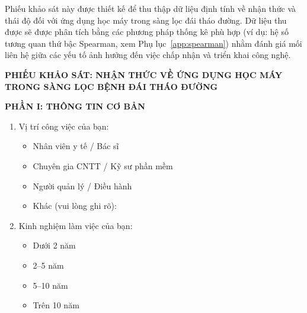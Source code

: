 \documentclass[14pt,a4paper]{extreport}
\begin{document}
Phiếu khảo sát này được thiết kế để thu thập dữ liệu định tính về nhận thức và thái độ đối với ứng dụng học máy trong sàng lọc đái tháo đường. Dữ liệu thu được sẽ được phân tích bằng các phương pháp thống kê phù hợp (ví dụ: hệ số tương quan thứ bậc Spearman, xem Phụ lục~\ref{app:spearman}) nhằm đánh giá mối liên hệ giữa các yếu tố ảnh hưởng đến việc chấp nhận và triển khai công nghệ.

\textbf{PHIẾU KHẢO SÁT: NHẬN THỨC VỀ ỨNG DỤNG HỌC MÁY TRONG SÀNG LỌC BỆNH ĐÁI THÁO ĐƯỜNG}

\noindent{}

\vspace{0.5cm}

\textbf{PHẦN I: THÔNG TIN CƠ BẢN}

\begin{enumerate}
  \item Vị trí công việc của bạn:
  \begin{itemize}
    \item[$\square$] Nhân viên y tế / Bác sĩ
    \item[$\square$] Chuyên gia CNTT / Kỹ sư phần mềm
    \item[$\square$] Người quản lý / Điều hành
    \item[$\square$] Khác (vui lòng ghi rõ): \underline{\hspace{4cm}}
  \end{itemize}

  \item Kinh nghiệm làm việc của bạn:
  \begin{itemize}
    \item[$\square$] Dưới 2 năm
    \item[$\square$] 2--5 năm
    \item[$\square$] 5--10 năm
    \item[$\square$] Trên 10 năm
  \end{itemize}
\end{enumerate}
\end{document}
